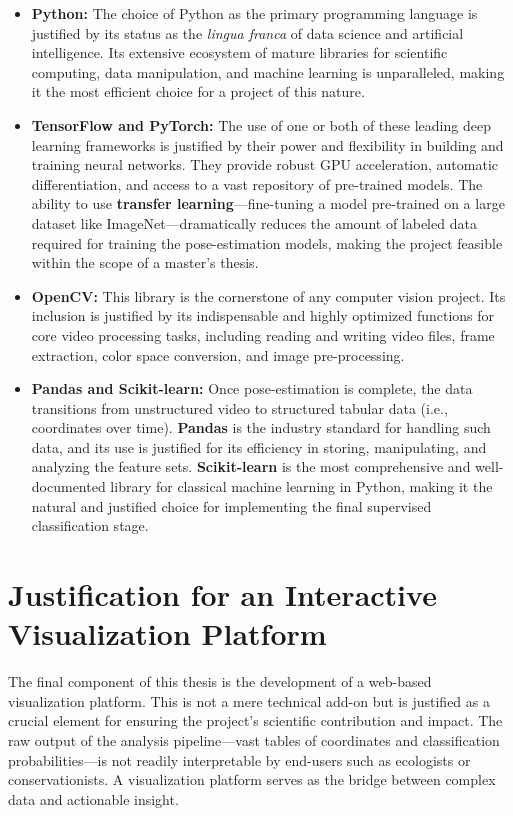 \begin{itemize}
    \item \textbf{Python:} The choice of Python as the primary programming language is justified by its status as the \textit{lingua franca} of data science and artificial intelligence. Its extensive ecosystem of mature libraries for scientific computing, data manipulation, and machine learning is unparalleled, making it the most efficient choice for a project of this nature.

    \item \textbf{TensorFlow and PyTorch:} The use of one or both of these leading deep learning frameworks is justified by their power and flexibility in building and training neural networks. They provide robust GPU acceleration, automatic differentiation, and access to a vast repository of pre-trained models. The ability to use \textbf{transfer learning}—fine-tuning a model pre-trained on a large dataset like ImageNet—dramatically reduces the amount of labeled data required for training the pose-estimation models, making the project feasible within the scope of a master's thesis.

    \item \textbf{OpenCV:} This library is the cornerstone of any computer vision project. Its inclusion is justified by its indispensable and highly optimized functions for core video processing tasks, including reading and writing video files, frame extraction, color space conversion, and image pre-processing.

    \item \textbf{Pandas and Scikit-learn:} Once pose-estimation is complete, the data transitions from unstructured video to structured tabular data (i.e., coordinates over time). \textbf{Pandas} is the industry standard for handling such data, and its use is justified for its efficiency in storing, manipulating, and analyzing the feature sets. \textbf{Scikit-learn} is the most comprehensive and well-documented library for classical machine learning in Python, making it the natural and justified choice for implementing the final supervised classification stage.
\end{itemize}

\section{Justification for an Interactive Visualization Platform}

The final component of this thesis is the development of a web-based visualization platform. This is not a mere technical add-on but is justified as a crucial element for ensuring the project's scientific contribution and impact. The raw output of the analysis pipeline—vast tables of coordinates and classification probabilities—is not readily interpretable by end-users such as ecologists or conservationists. A visualization platform serves as the bridge between complex data and actionable insight.

